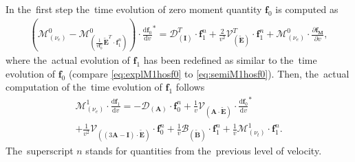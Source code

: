 \documentclass[preprint,12pt]{elsarticle}
\newcommand{\pdv}[2]{\frac{\partial{#1}}{\partial{#2}}}
\newcommand{\vect}[1]{\boldsymbol{#1}}
\newcommand{\matr}[1]{\mathbf{#1}}
\newcommand{\dI}{\text{d}}
\newcommand{\odv}[2]{\frac{\dI #1}{\dI #2}}
\newcommand{\ddv}[2]{\odv{#1}{#2}}
\newcommand{\nue}{\nu_{e}}
\newcommand{\nutot}{\nu_{t}}
\newcommand{\vmag}{v}
\newcommand{\tE}{\vect{\tilde{E}}}
\newcommand{\tB}{\vect{\tilde{B}}}
\newcommand{\fM}{f_M}
\newcommand{\vfzero}{\vect{f}_0}
\newcommand{\fone}{\vect{f}_1}
\newcommand{\MI}{\matr{I}}
\newcommand{\MA}{\matr{A}}
\newcommand{\IM}{\boldsymbol{\mathcal{M}}}
\newcommand{\ID}{\boldsymbol{\mathcal{D}}}
\newcommand{\IV}{\boldsymbol{\mathcal{V}}}
\newcommand{\IB}{\boldsymbol{\mathcal{B}}}
\newcommand{\figref}[1]{FIG.~\ref{#1}}
\begin{document}
In the~first step the~time evolution of zero moment quantity $\vfzero$ is 
computed as
\begin{multline}
  \left( \IM^0_{\left( \nue \right)} 
  - \IM^0_{\left(\frac{1}{\vmag \vfzero^n}\tE^T\cdot\fone^n\right)}
  \right) \cdot {\ddv{\vfzero}{\vmag}}^* 
  = 
  \ID^T_{\left(\MI\right)} \cdot \fone^n 
  + \frac{2}{\vmag^2}\IV^T_{\left(\tE\right)} \cdot \fone^n
  + \IM^0_{\left( \nue \right)} \cdot \pdv{\vect{\fM}}{\vmag} ,  
  \label{eq:explM1hosf0}
\end{multline}
where the~actual evolution of $\fone$ has been redefined as similar to 
the~time evolution of $\vfzero$ (compare \eqref{eq:explM1hosf0} to 
\eqref{eq:semiM1hosf0}). Then, the~actual computation of the~time evolution 
of $\fone$ follows
\begin{multline}
  \IM^1_{\left( \nue \right)} \cdot \ddv{\fone}{\vmag} 
  = 
  - \ID_{\left(\MA\right)}\cdot \vfzero^n  
  + \frac{1}{\vmag}\IV_{\left(\MA \cdot \tE\right)} \cdot
  {\ddv{\vfzero}{\vmag}}^* \\
  + \frac{1}{\vmag^2}\IV_{\left( 
  \left( 3\MA - \MI \right) \cdot \tE \right)} \cdot \vfzero^n
  + \frac{1}{\vmag}\IB_{\left( \tB \right)} \cdot \fone^n
  + \frac{1}{\vmag}\IM^1_{\left( \nutot \right)} 
  \cdot \fone^n .
  \label{eq:explM1hosf1}
\end{multline}
The~superscript $n$ stands for quantities from the~previous level of velocity.


\end{document}
